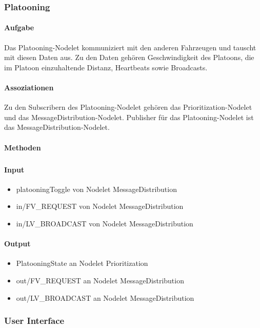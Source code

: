 \documentclass[a4paper, 12pt, titlepage]{scrartcl}
\begin{document}
			\subsubsection{Platooning}
			\label{platooning}
				\paragraph{Aufgabe} Das Platooning-Nodelet kommuniziert mit den anderen Fahrzeugen und tauscht mit diesen Daten aus. Zu den Daten gehören Geschwindigkeit des Platoons, die im Platoon einzuhaltende Distanz, Heartbeats sowie Broadcasts.
				\paragraph{Assoziationen} Zu den Subscribern des Platooning-Nodelet gehören das Prioritization-Nodelet und das MessageDistribution-Nodelet. Publisher für das Platooning-Nodelet ist das MessageDistribution-Nodelet.
				\paragraph{Methoden}
					\subparagraph{}
				\paragraph{Input}
				    \begin{itemize}
    					\item platooningToggle von Nodelet MessageDistribution
    					\item in/FV\_REQUEST von Nodelet MessageDistribution
    					\item in/LV\_BROADCAST von Nodelet MessageDistribution
    				\end{itemize}
				\paragraph{Output}
					\begin{itemize}
    					\item PlatooningState an Nodelet Prioritization
    					\item out/FV\_REQUEST an Nodelet MessageDistribution
    					\item out/LV\_BROADCAST an Nodelet MessageDistribution
    				\end{itemize}

		    \subsubsection{User Interface}
			\label{user_interfcae}
\end{document}
